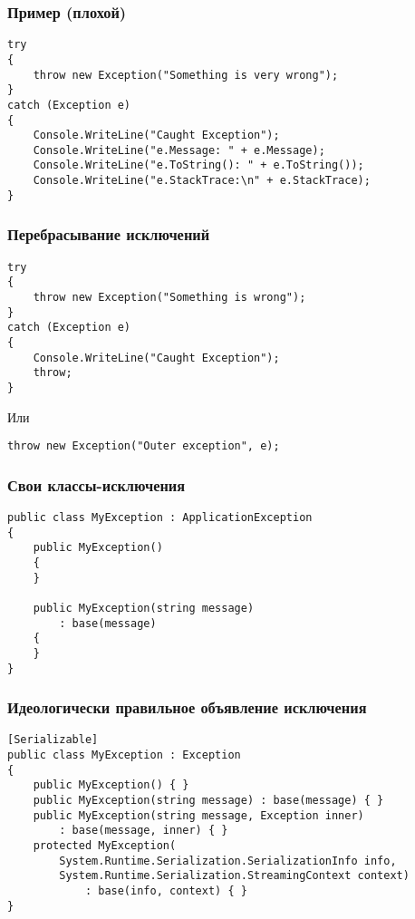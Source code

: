 \documentclass[xetex,mathserif,serif]{beamer}
\begin{document}
	\begin{frame}[fragile]
		\frametitle{Пример (плохой)}
		\begin{verbatim}
try
{
    throw new Exception("Something is very wrong");
}
catch (Exception e)
{
    Console.WriteLine("Caught Exception");
    Console.WriteLine("e.Message: " + e.Message);
    Console.WriteLine("e.ToString(): " + e.ToString());
    Console.WriteLine("e.StackTrace:\n" + e.StackTrace);
}
		\end{verbatim}
	\end{frame}

	\begin{frame}[fragile]
		\frametitle{Перебрасывание исключений}
		\begin{verbatim}
try
{
    throw new Exception("Something is wrong");
}
catch (Exception e)
{
    Console.WriteLine("Caught Exception");
    throw;
}
		\end{verbatim}

		Или
		\begin{verbatim}
throw new Exception("Outer exception", e);
		\end{verbatim}
	\end{frame}

	\begin{frame}[fragile]
		\frametitle{Свои классы-исключения}
		\begin{verbatim}
public class MyException : ApplicationException
{
    public MyException() 
    {
    }

    public MyException(string message)
        : base(message)
    {
    }
}
		\end{verbatim}
	\end{frame}

	\begin{frame}[fragile]
		\frametitle{Идеологически правильное объявление исключения}
		\begin{verbatim}
[Serializable]
public class MyException : Exception
{
    public MyException() { }
    public MyException(string message) : base(message) { }
    public MyException(string message, Exception inner) 
        : base(message, inner) { }
    protected MyException(
        System.Runtime.Serialization.SerializationInfo info,
        System.Runtime.Serialization.StreamingContext context)
            : base(info, context) { }
}
		\end{verbatim}
	\end{frame}
\end{document}
